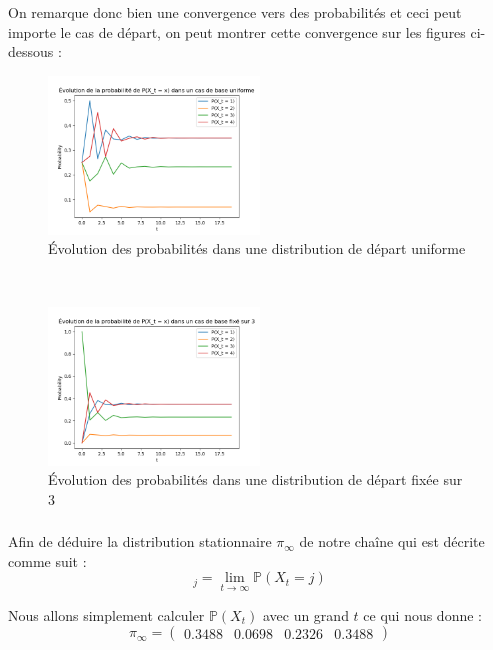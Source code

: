 On remarque donc bien une convergence vers des probabilités et ceci peut importe le cas de départ, on peut montrer cette convergence sur les figures ci-dessous :
\begin{figure}[h!]
  \centering
  \includegraphics[width=0.5\textwidth]{figs/evo_unif.png}
  \caption{Évolution des probabilités dans une distribution de départ uniforme}
\end{figure}
\\
\begin{figure}[h!]
  \centering
  \includegraphics[width=0.5\textwidth]{figs/evo_fixed.png}
  \caption{Évolution des probabilités dans une distribution de départ fixée sur 3}
\end{figure}

\subsubsection{}

Afin de déduire la distribution stationnaire $\pi_{\infty}$ de notre chaîne qui est décrite comme suit :
\begin{equation*}
  [\pi_\infty]_j = \lim_{t \rightarrow \infty} \mathbb{P}(X_t = j)
\end{equation*}

Nous allons simplement calculer $\mathbb{P}(X_t)$ avec un grand $t$ ce qui nous donne :
\begin{equation*}
  \pi_{\infty} = 
  \begin{pmatrix}
    0.3488 & 0.0698 & 0.2326 & 0.3488
  \end{pmatrix}
\end{equation*}

